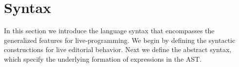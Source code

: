 \section{Syntax}
%
In this section we introduce the language syntax that encompasses the generalized features for live-programming. We begin by defining the syntactic constructions for live editorial behavior. Next we define the abstract syntax, which specify the underlying formation of expressions in the AST.
%

